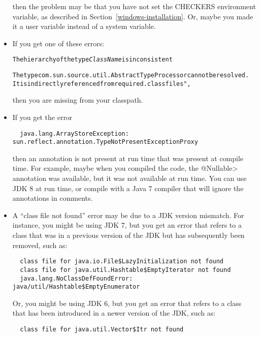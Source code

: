 \begin{itemize}
\noindent
then the problem may be that you have not set the CHECKERS environment
variable, as described in Section~\ref{windows-installation}.  Or, maybe
you made it a user variable instead of a system variable.

\item
If you get one of these errors:

\begin{alltt}
The hierarchy of the type \emph{ClassName} is inconsistent

The type com.sun.source.util.AbstractTypeProcessor cannot be resolved.
  It is indirectly referenced from required .class files", 
\end{alltt}

\noindent
then you are missing  from your classpath.

\item
If you get the error

\begin{Verbatim}
  java.lang.ArrayStoreException: sun.reflect.annotation.TypeNotPresentExceptionProxy
\end{Verbatim}

\noindent
then an annotation is not present at run time that was present at compile
time.  For example, maybe when you compiled the code, the \<@Nullable>
annotation was available, but it was not available at run time.
You can use JDK 8 at run time, or compile
with a Java 7 compiler that will ignore the annotations in comments.

\item
A ``class file not found'' error may be due to a JDK version mismatch.
For instance, you might be using JDK 7, but you get an error that refers to a class that was in a
previous version of the JDK but has subsequently been removed, such as:

\begin{Verbatim}
  class file for java.io.File$LazyInitialization not found
  class file for java.util.Hashtable$EmptyIterator not found
  java.lang.NoClassDefFoundError: java/util/Hashtable$EmptyEnumerator
\end{Verbatim}

Or, you might be using JDK 6, but you get an error that refers to a class
that has been introduced in a newer version of the JDK, such as:

\begin{Verbatim}
  class file for java.util.Vector$Itr not found
\end{Verbatim}


\end{itemize}
